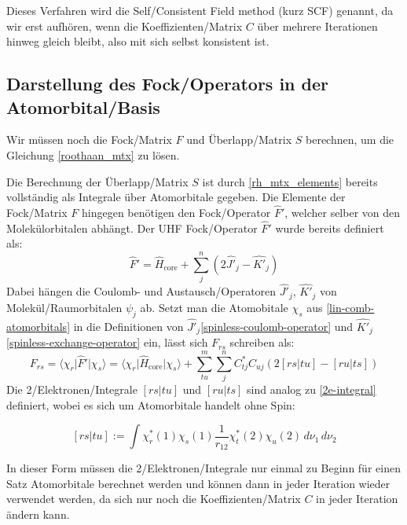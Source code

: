 Dieses Verfahren wird die Self\-/Consistent Field method (kurz SCF) genannt,
da wir erst aufhören, wenn die Koeffizienten\-/Matrix $C$
über mehrere Iterationen hinweg gleich bleibt, also mit sich selbst konsistent ist.\\


\subsection{Darstellung des Fock\-/Operators in der Atomorbital\-/Basis}\label{F_S_mtx_calc}

Wir müssen noch die Fock\-/Matrix $F$ und Überlapp\-/Matrix $S$ berechnen,
um die Gleichung \cref{roothaan_mtx} zu lösen.

Die Berechnung der Überlapp\-/Matrix $S$ ist durch \cref{rh_mtx_elements} bereits vollständig
als Integrale über Atomorbitale gegeben.
Die Elemente der Fock\-/Matrix $F$ hingegen benötigen den Fock\-/Operator $\hat{F}'$,
welcher selber von den Molekülorbitalen abhängt.
Der UHF Fock\-/Operator $\hat{F}'$ wurde bereits definiert als:
\begin{equation}
    \hat{F}' = \hat{H}_{\text{core}} + \sum_j^{n}
    \left( 2\hat{J'}_j - \hat{K'}_j \right)
\end{equation}
Dabei hängen die Coulomb- und Austausch\-/Operatoren $\hat{J'}_j$, $\hat{K'}_j$
von Molekül\-/Raumorbitalen $\psi_j$ ab.
Setzt man die Atomobitale $\chi_s$ aus \cref{lin-comb-atomorbitals} in
die Definitionen von $\hat{J'}_j$\cref{spinless-coulomb-operator} und
$\hat{K'}_j$ \cref{spinless-exchange-operator} ein, lässt sich $F_{r s}$ schreiben als:
\begin{equation}\label{fock-matrix-element}
    F_{rs} = \langle \chi_r \vert \hat{F}' \vert \chi_s \rangle
    = \langle \chi_r \vert \hat{H}_{\text{core}} \vert \chi_s \rangle
    + \sum_{tu}^m \sum_j^{n} C_{tj}^*C_{uj}\left( 2[rs\vert tu] - [ru\vert ts] \right)
\end{equation}
Die 2\-/Elektronen\-/Integrale $[rs\vert tu]$ und $[ru\vert ts]$
sind analog zu \cref{2e-integral} definiert, wobei es sich um Atomorbitale handelt ohne Spin:

\begin{equation}\label{2e-integral-ao}
    [rs\vert tu] := 
    \int \chi_r^*(1) \chi_s(1) \frac{1}{r_{12}} \chi_t^*(2) \chi_u(2) \,d\nu _1 \,d\nu_2
\end{equation}

In dieser Form müssen die 2\-/Elektronen\-/Integrale nur einmal
zu Beginn für einen Satz Atomorbitale berechnet werden und
können dann in jeder Iteration wieder verwendet werden,
da sich nur noch die Koeffizienten\-/Matrix $C$ in jeder Iteration ändern kann.


